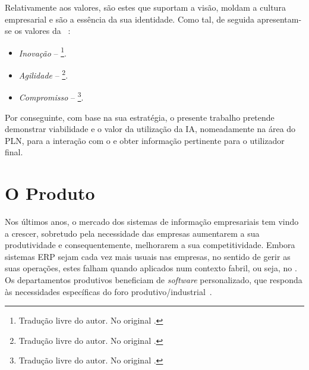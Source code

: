 Relativamente aos valores, são estes que suportam a visão, moldam a cultura empresarial e são a essência da sua identidade. Como tal, de seguida apresentam-se os valores da {\companyname}~\parencite{cmf_strategy}:

\begin{itemize}
    \item 
    {
        \textit{Inovação} -- \footnote{Tradução livre do autor. No original .}.
    }
    \item
    {
        \textit{Agilidade} -- \footnote{Tradução livre do autor. No original .}.
    }
    \item
    {
        \textit{Compromisso} -- \footnote{Tradução livre do autor. No original .}.
    }
\end{itemize}

Por conseguinte, com base na sua estratégia, o presente trabalho pretende demonstrar viabilidade e o valor da utilização da \gls{IA}, nomeadamente na área do \gls{PLN}, para a interação com o {\productname} e obter informação pertinente para o utilizador final. 

\section{O Produto}
\label{sec:chap2_product}

Nos últimos anos, o mercado dos sistemas de informação empresariais tem vindo a crescer, sobretudo pela necessidade das empresas aumentarem a sua produtividade e consequentemente, melhorarem a sua competitividade. Embora sistemas \gls{ERP} sejam cada vez mais usuais nas empresas, no sentido de gerir as suas operações, estes falham quando aplicados num contexto fabril, ou seja, no . Os departamentos produtivos beneficiam de \textit{software} personalizado, que responda às necessidades específicas do foro produtivo/industrial~\parencite{mes_literature_review}. 

